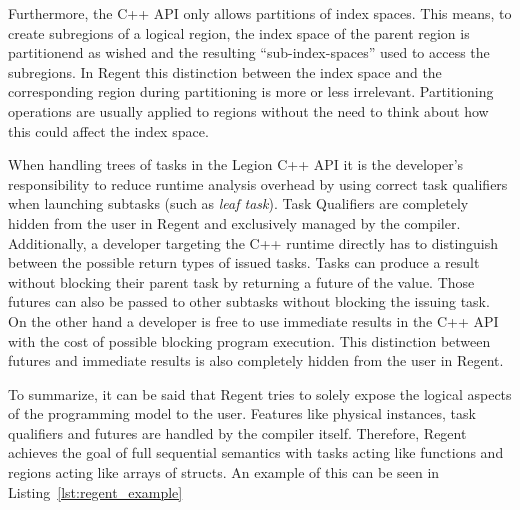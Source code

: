 \documentclass{article}      %
\begin{document}
Furthermore, the C++ API only allows partitions of index spaces. This means, to create subregions of a logical region, the index space of the parent region is partitionend as wished and the resulting ``sub-index-spaces'' used to access the subregions. In Regent this distinction between the index space and the corresponding region during partitioning is more or less irrelevant. Partitioning operations are usually applied to regions without the need to think about how this could affect the index space.

When handling trees of tasks in the Legion C++ API it is the developer's responsibility to reduce runtime analysis overhead by using correct task qualifiers when launching subtasks (such as \emph{leaf task}). Task Qualifiers are completely hidden from the user in Regent and exclusively managed by the compiler. Additionally, a developer targeting the C++ runtime directly has to distinguish between the possible return types of issued tasks. Tasks can produce a result without blocking their parent task by returning a future of the value. Those futures can also be passed to other subtasks without blocking the issuing task. On the other hand a developer is free to use immediate results in the C++ API with the cost of possible blocking program execution. This distinction between futures and immediate results is also completely hidden from the user in Regent.

To summarize, it can be said that Regent tries to solely expose the logical aspects of the programming model to the user. Features like physical instances, task qualifiers and futures are handled by the compiler itself. Therefore, Regent achieves the goal of full sequential semantics with tasks acting like functions and regions acting like arrays of structs. An example of this can be seen in Listing~\ref{lst:regent_example}
\end{document}
